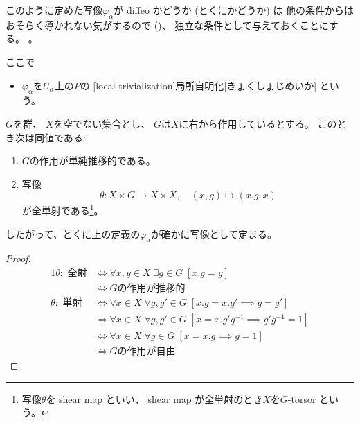 \documentclass[report]{jlreq}
\begin{document}
\begin{definition}[主ファイバー束]
\begin{enumerate}
\begin{enumerate}[label=(\arabic{enumi}-\alph*)]
{                        このように定めた写像$\varphi_\alpha$が diffeo かどうか
                        (とくに{\smooth}かどうか) は
                        他の条件からはおそらく導かれない気がするので ()、
                        独立な条件として与えておくことにする。
                    }。
            \end{enumerate}
    \end{enumerate}
    ここで
    \begin{itemize}
        \item $\varphi_\alpha$を$U_\alpha$上の$P$の
            [local trivialization]{局所自明化}[きょくしょじめいか]
            という。
    \end{itemize}
\end{definition}

\begin{lemma}
    $G$を群、
    $X$を空でない集合とし、
    $G$は$X$に右から作用しているとする。
    このとき次は同値である:
    \begin{enumerate}
        \item $G$の作用が単純推移的である。
        \item 写像
            \begin{equation}
                \theta \colon X \times G \to X \times X,
                \quad
                (x, g) \mapsto (x.g, x)
            \end{equation}
            が全単射である\footnote{
                写像$\theta$を shear map といい、
                shear map が全単射のとき$X$を$G$-torsor という。
            }。
    \end{enumerate}
    したがって、とくに上の定義の$\varphi_\alpha$が確かに写像として定まる。
\end{lemma}

\begin{proof}
    \begin{alignat}{1}
        \theta \colon \text{ 全射}
            &\iff \forall x, y \in X \; \exists g \in G \; [x.g = y] \\
            &\iff \text{$G$の作用が推移的} \\
        \theta \colon \text{ 単射}
            &\iff \forall x \in X \;
                \forall g, g' \in G \;
                [x.g = x.g' \implies g = g'] \\
            &\iff \forall x \in X \;
                \forall g, g' \in G \;
                [x = x.g'g^{-1} \implies g'g^{-1} = 1] \\
            &\iff \forall x \in X \;
                \forall g \in G \;
                [x = x.g \implies g = 1] \\
            &\iff \text{$G$の作用が自由}
    \end{alignat}
\end{proof}
\end{document}
